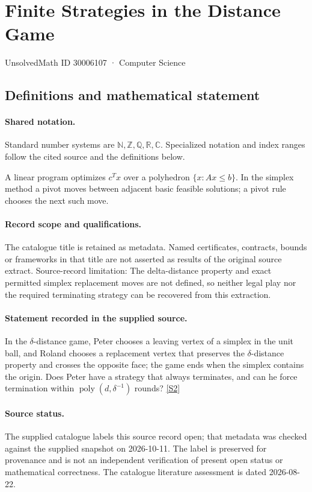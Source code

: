 \documentclass[11pt]{article}
\newcommand{\sref}[2]{\hyperlink{source:#1:#2}{[S#2]}}
\begin{document}
\setcounter{section}{30006106}
\section{Finite Strategies in the Distance Game}\label{30006107}
{\small\sffamily UnsolvedMath ID 30006107 · Computer Science}
\subsection{Definitions and mathematical statement}

\paragraph{Shared notation.}Standard number systems are $\mathbb N,\mathbb Z,\mathbb Q,\mathbb R,\mathbb C$. Specialized notation and index ranges follow the cited source and the definitions below.


A linear program optimizes $c^Tx$ over a polyhedron $\{x:Ax\leq b\}$. In the simplex method a pivot moves between adjacent basic feasible solutions; a pivot rule chooses the next such move.
\paragraph{Record scope and qualifications.}
The catalogue title is retained as metadata. Named certificates, contracts, bounds or frameworks in that title are not asserted as results of the original source extract.
Source-record limitation: The delta-distance property and exact permitted simplex replacement moves are not defined, so neither legal play nor the required terminating strategy can be recovered from this extraction.
\paragraph{Statement recorded in the supplied source.}
In the $\delta$-distance game, Peter chooses a leaving vertex of a simplex in the unit ball, and Roland chooses a replacement vertex that preserves the $\delta$-distance property and crosses the opposite face; the game ends when the simplex contains the origin. Does Peter have a strategy that always terminates, and can he force termination within $\operatorname{poly}(d,\delta^{-1})$ rounds? \sref{30006107}{2}
\paragraph{Source status.}
The supplied catalogue labels this source record open; that metadata was checked against the supplied snapshot on 2026-10-11. The label is preserved for provenance and is not an independent verification of present open status or mathematical correctness. The catalogue literature assessment is dated 2026-08-22.
\end{document}
